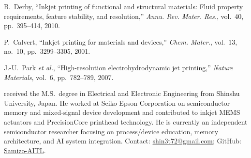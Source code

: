 \documentclass[conference]{IEEEtran}
\begin{document}
\begin{thebibliography}{99}
B.~Derby, ``Inkjet printing of functional and structural materials: Fluid property requirements, feature stability, and resolution,'' \emph{Annu. Rev. Mater. Res.}, vol.~40, pp.~395--414, 2010.

P.~Calvert, ``Inkjet printing for materials and devices,'' \emph{Chem. Mater.}, vol.~13, no.~10, pp.~3299--3305, 2001.

J.-U.~Park \emph{et al.}, ``High-resolution electrohydrodynamic jet printing,'' \emph{Nature Materials}, vol.~6, pp.~782--789, 2007.
\end{thebibliography}

received the M.S.\ degree in Electrical and Electronic Engineering from Shinshu University, Japan. He worked at Seiko Epson Corporation on semiconductor memory and mixed-signal device development and contributed to inkjet MEMS actuators and PrecisionCore printhead technology. He is currently an independent semiconductor researcher focusing on process/device education, memory architecture, and AI system integration. Contact: \href{mailto:shin3t72@gmail.com}{shin3t72@gmail.com}; GitHub: \href{https://github.com/Samizo-AITL}{Samizo-AITL}.
\end{document}

